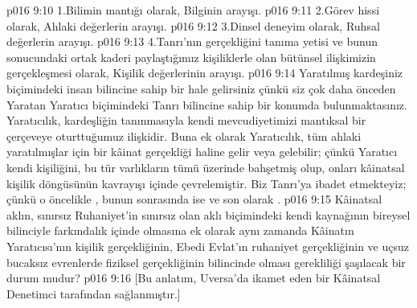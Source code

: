 \vs p016 9:10 1.\bibnobreakspace Bilimin mantığı olarak, Bilginin arayışı.
\vs p016 9:11 2.\bibnobreakspace Görev hissi olarak, Ahlaki değerlerin arayışı.
\vs p016 9:12 3.\bibnobreakspace Dinsel deneyim olarak, Ruhsal değerlerin arayışı.
\vs p016 9:13 4.\bibnobreakspace Tanrı’nın gerçekliğini tanıma yetisi ve bunun sonucundaki ortak kaderi paylaştığımız kişiliklerle olan bütünsel ilişkimizin gerçekleşmesi olarak, Kişilik değerlerinin arayışı.
\vs p016 9:14 Yaratılmış kardeşiniz biçimindeki insan bilincine sahip bir hale gelirsiniz çünkü siz çok daha önceden Yaratan Yaratıcı biçimindeki Tanrı bilincine sahip bir konumda bulunmaktasınız. Yaratıcılık, kardeşliğin tanınmasıyla kendi mevcudiyetimizi mantıksal bir çerçeveye oturttuğumuz ilişkidir. Buna ek olarak Yaratıcılık, tüm ahlaki yaratılmışlar için bir kâinat gerçekliği haline gelir veya gelebilir; çünkü Yaratıcı kendi kişiliğini, bu tür varlıkların tümü üzerinde bahşetmiş olup, onları kâinatsal kişilik döngüsünün kavrayışı içinde çevrelemiştir. Biz Tanrı’ya ibadet etmekteyiz; çünkü o öncelikle , bunun sonrasında ise  ve son olarak .
\vs p016 9:15 Kâinatsal aklın, sınırsız Ruhaniyet’in sınırsız olan aklı biçimindeki kendi kaynağının bireysel bilinciyle farkındalık içinde olmasına ek olarak aynı zamanda Kâinatın Yaratıcısı’nın kişilik gerçekliğinin, Ebedi Evlat’ın ruhaniyet gerçekliğinin ve uçsuz bucaksız evrenlerde fiziksel gerçekliğinin bilincinde olması gerekliliği şaşılacak bir durum mudur?
\vs p016 9:16 [Bu anlatım, Uversa’da ikamet eden bir Kâinatsal Denetimci tarafından sağlanmıştır.]
